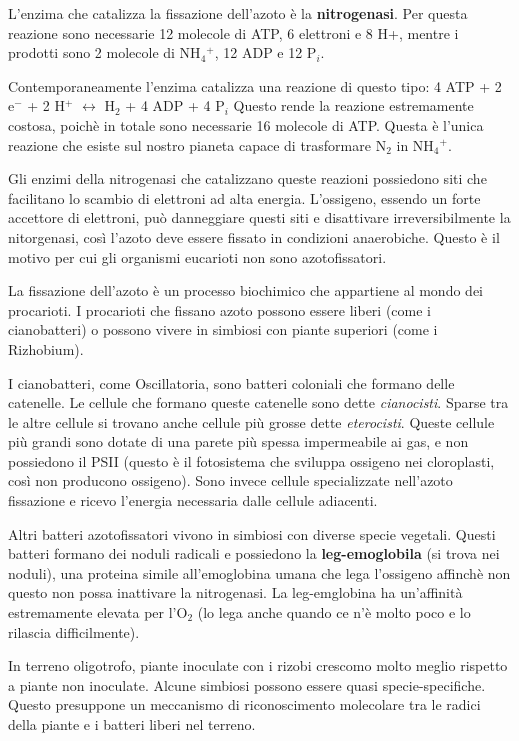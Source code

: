 \documentclass[]{article}
\begin{document}
L'enzima che catalizza la fissazione dell'azoto è la
\textbf{nitrogenasi}. Per questa reazione sono necessarie 12 molecole di
ATP, 6 elettroni e 8 H+, mentre i prodotti sono 2 molecole di
NH$_4$$^+$, 12 ADP e 12 P$_i$.

Contemporaneamente l'enzima catalizza una reazione di questo tipo: 4 ATP
+ 2 e$^-$ + 2 H$^+$ $\longleftrightarrow$ H$_2$ + 4 ADP + 4 P$_i$ Questo
rende la reazione estremamente costosa, poichè in totale sono necessarie
16 molecole di ATP. Questa è l'unica reazione che esiste sul nostro
pianeta capace di trasformare N$_2$ in NH$_4$$^+$.

Gli enzimi della nitrogenasi che catalizzano queste reazioni possiedono
siti che facilitano lo scambio di elettroni ad alta energia. L'ossigeno,
essendo un forte accettore di elettroni, può danneggiare questi siti e
disattivare irreversibilmente la nitorgenasi, così l'azoto deve essere
fissato in condizioni anaerobiche. Questo è il motivo per cui gli
organismi eucarioti non sono azotofissatori.

La fissazione dell'azoto è un processo biochimico che appartiene al
mondo dei procarioti. I procarioti che fissano azoto possono essere
liberi (come i cianobatteri) o possono vivere in simbiosi con piante
superiori (come i Rizhobium).

I cianobatteri, come Oscillatoria, sono batteri coloniali che formano
delle catenelle. Le cellule che formano queste catenelle sono dette
\emph{cianocisti}. Sparse tra le altre cellule si trovano anche cellule
più grosse dette \emph{eterocisti}. Queste cellule più grandi sono
dotate di una parete più spessa impermeabile ai gas, e non possiedono il
PSII (questo è il fotosistema che sviluppa ossigeno nei cloroplasti,
così non producono ossigeno). Sono invece cellule specializzate
nell'azoto fissazione e ricevo l'energia necessaria dalle cellule
adiacenti.

Altri batteri azotofissatori vivono in simbiosi con diverse specie
vegetali. Questi batteri formano dei noduli radicali e possiedono la
\textbf{leg-emoglobila} (si trova nei noduli), una proteina simile
all'emoglobina umana che lega l'ossigeno affinchè non questo non possa
inattivare la nitrogenasi. La leg-emglobina ha un'affinità estremamente
elevata per l'O$_2$ (lo lega anche quando ce n'è molto poco e lo
rilascia difficilmente).

In terreno oligotrofo, piante inoculate con i rizobi crescomo molto
meglio rispetto a piante non inoculate. Alcune simbiosi possono essere
quasi specie-specifiche. Questo presuppone un meccanismo di
riconoscimento molecolare tra le radici della piante e i batteri liberi
nel terreno.
\end{document}
